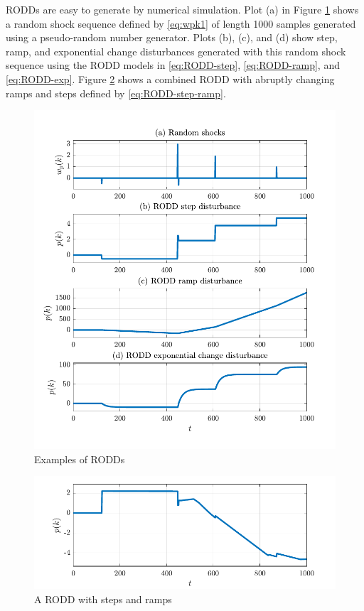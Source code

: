 \gls{RODD}s are easy to generate by numerical simulation.  Plot (a) in Figure \ref{fig:rodd-sim-plots} shows a random shock sequence defined by \eqref{eq:wpk1} of length 1000 samples generated using a pseudo-random number generator. Plots (b), (c), and (d) show step, ramp, and exponential change disturbances generated with this random shock sequence using the \gls{RODD} models in \eqref{eq:RODD-step}, \eqref{eq:RODD-ramp}, and \eqref{eq:RODD-exp}. Figure \ref{fig:rodd-sim-plot2} shows a combined \gls{RODD} with abruptly changing ramps and steps defined by \eqref{eq:RODD-step-ramp}.
\begin{figure}[htp]
	\centering
	\includegraphics[width=13cm]{images/rodd_sim_plots.pdf}
	\caption{Examples of \gls{RODD}s}
	\label{fig:rodd-sim-plots}
\end{figure}
\begin{figure}[htp]
	\centering
	\includegraphics[width=13cm]{images/rodd_sim_plot2.pdf}
	\caption{A \gls{RODD} with steps and ramps}
	\label{fig:rodd-sim-plot2}
\end{figure}


